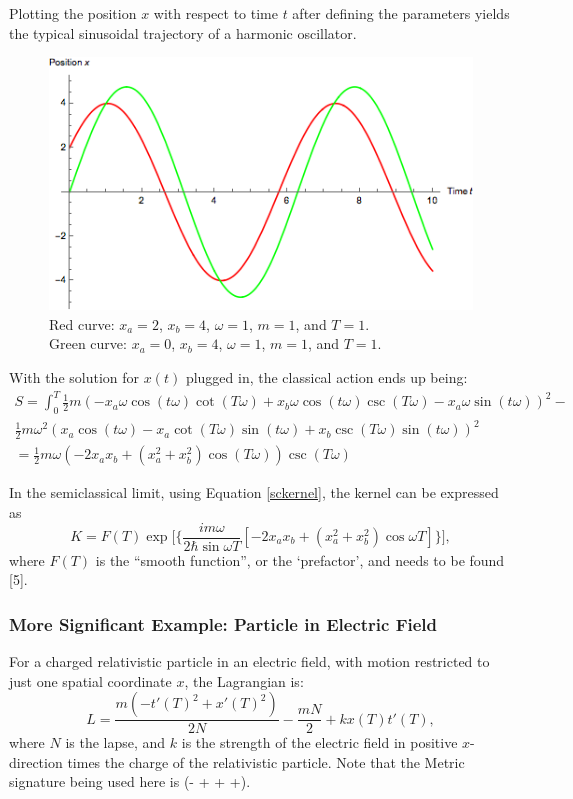 \documentclass[12pt]{revtex4}
\begin{document}
Plotting the position $x$ with respect to time $t$ after defining the parameters yields the typical sinusoidal trajectory of a harmonic oscillator.

\begin{figure}[h]
	\centering
	\includegraphics[width=0.7\linewidth]{"oscillator trajectory"}
	\caption[Trajectories of a harmonic oscillator with different parameters]{Red curve: $x_a=2$, $x_b=4$, $\omega=1$, $m=1$, and $T=1$.\\ Green curve: $x_a=0$, $x_b=4$, $\omega=1$, $m=1$, and $T=1$.}
	\label{fig:oscillator}
\end{figure}

With the solution for $x(t)$ plugged in, the classical action ends up being:
\begin{multline*}
S = \int_{0}^{T} \frac{1}{2} m (-x_a \omega \cos(t \omega) \cot(T \omega) + 
x_b \omega \cos(t \omega) \csc(T \omega) - 
x_a \omega \sin(t \omega))^2 - \\
\frac{1}{2} m \omega^2 (x_a \cos(t \omega) - 
x_a \cot(T \omega) \sin(t \omega) + 
x_b \csc(T \omega) \sin(t \omega))^2 \\
= \frac{1}{2} m \omega (-2 x_a x_b + (x_a^2 + x_b^2) \cos(T \omega)) \csc(T \omega)
\end{multline*} 

In the semiclassical limit, using Equation \ref{sckernel}, the kernel can be expressed as 
\[ K=F(T) \exp \Bigg[{\Bigg\{\frac{im\omega}{2 \hbar \sin\omega T} [-2 x_a x_b + (x_a^2 + x_b^2) \cos \omega T]\Bigg\}}\Bigg],\]
where $F(T)$ is the ``smooth function'', or the `prefactor', and needs to be found [5]. 

\subsubsection{More Significant Example: Particle in Electric Field}
For a charged relativistic particle in an electric field, with motion restricted to just one spatial coordinate $x$, the Lagrangian is:
\[ L = \frac{m (-t'(T)^2 + x'(T)^2)}{2N} -\frac{m N}{2} + k x(T) t'(T),\]
where $N$ is the lapse, and $k$ is the strength of the electric field in positive $x$-direction times the charge of the relativistic particle. Note that the Metric signature being used here is (- + + +).
\end{document}
